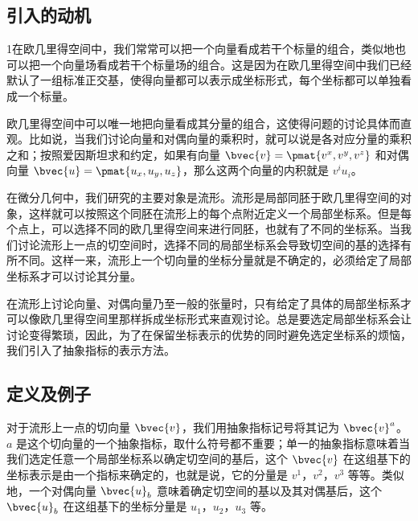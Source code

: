 

\begin{issues}
\issueMissDepend
\end{issues}

\subsection{引入的动机}
1在欧几里得空间中，我们常常可以把一个向量看成若干个标量的组合，类似地也可以把一个向量场看成若干个标量场的组合。这是因为在欧几里得空间中我们已经默认了一组标准正交基，使得向量都可以表示成坐标形式，每个坐标都可以单独看成一个标量。

欧几里得空间中可以唯一地把向量看成其分量的组合，这使得问题的讨论具体而直观。比如说，当我们讨论向量和对偶向量的乘积时，就可以说是各对应分量的乘积之和；按照爱因斯坦求和约定，如果有向量 $\bvec{v}=\pmat{v^x, v^y, v^z}$ 和对偶向量 $\bvec{u}=\pmat{u_x, u_y, u_z}$，那么这两个向量的内积就是 $v^iu_i$。

在微分几何中，我们研究的主要对象是流形。流形是局部同胚于欧几里得空间的对象，这样就可以按照这个同胚在流形上的每个点附近定义一个局部坐标系。但是每个点上，可以选择不同的欧几里得空间来进行同胚，也就有了不同的坐标系。当我们讨论流形上一点的切空间时，选择不同的局部坐标系会导致切空间的基的选择有所不同。这样一来，流形上一个切向量的坐标分量就是不确定的，必须给定了局部坐标系才可以讨论其分量。

在流形上讨论向量、对偶向量乃至一般的张量时，只有给定了具体的局部坐标系才可以像欧几里得空间里那样拆成坐标形式来直观讨论。总是要选定局部坐标系会让讨论变得繁琐，因此，为了在保留坐标表示的优势的同时避免选定坐标系的烦恼，我们引入了抽象指标的表示方法。

\subsection{定义及例子}

对于流形上一点的切向量 $\bvec{v}$，我们用抽象指标记号将其记为 $\bvec{v}^a$。$a$ 是这个切向量的一个抽象指标，取什么符号都不重要；单一的抽象指标意味着当我们选定任意一个局部坐标系以确定切空间的基后，这个 $\bvec{v}$ 在这组基下的坐标表示是由一个指标来确定的，也就是说，它的分量是 $v^1$，$v^2$，$v^3$ 等等。类似地，一个对偶向量 $\bvec{u}_b$ 意味着确定切空间的基以及其对偶基后，这个 $\bvec{u}_b$ 在这组基下的坐标分量是 $u_1$，$u_2$，$u_3$ 等。

